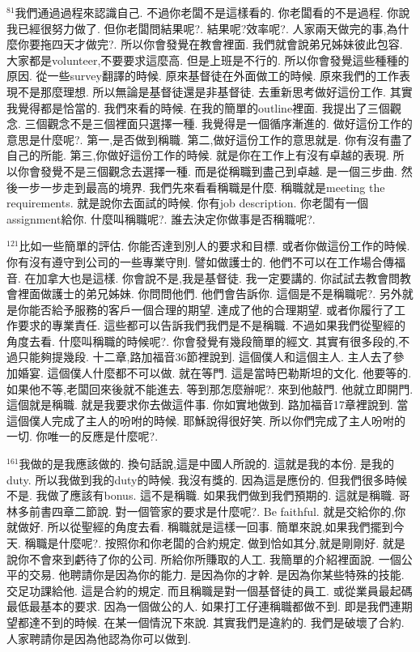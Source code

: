 \documentclass{book}
\begin{document}
$^{81}$我們通過過程來認識自己.
不過你老闆不是這樣看的.
你老闆看的不是過程.
你說我已經很努力做了.
但你老闆問結果呢?.
結果呢?效率呢?.
人家兩天做完的事,為什麼你要拖四天才做完?.
所以你會發覺在教會裡面.
我們就會說弟兄姊妹彼此包容.
大家都是volunteer,不要要求這麼高.
但是上班是不行的.
所以你會發覺這些種種的原因.
從一些survey翻譯的時候.
原來基督徒在外面做工的時候.
原來我們的工作表現不是那麼理想.
所以無論是基督徒還是非基督徒.
去重新思考做好這份工作.
其實我覺得都是恰當的.
我們來看的時候.
在我的簡單的outline裡面.
我提出了三個觀念.
三個觀念不是三個裡面只選擇一種.
我覺得是一個循序漸進的.
做好這份工作的意思是什麼呢?.
第一,是否做到稱職.
第二,做好這份工作的意思就是.
你有沒有盡了自己的所能.
第三,你做好這份工作的時候.
就是你在工作上有沒有卓越的表現.
所以你會發覺不是三個觀念去選擇一種.
而是從稱職到盡己到卓越.
是一個三步曲.
然後一步一步走到最高的境界.
我們先來看看稱職是什麼.
稱職就是meeting the requirements.
就是說你去面試的時候.
你有job description.
你老闆有一個assignment給你.
什麼叫稱職呢?.
誰去決定你做事是否稱職呢?.

$^{121}$比如一些簡單的評估.
你能否達到別人的要求和目標.
或者你做這份工作的時候.
你有沒有遵守到公司的一些專業守則.
譬如做護士的.
他們不可以在工作場合傳福音.
在加拿大也是這樣.
你會說不是,我是基督徒.
我一定要講的.
你試試去教會問教會裡面做護士的弟兄姊妹.
你問問他們.
他們會告訴你.
這個是不是稱職呢?.
另外就是你能否給予服務的客戶一個合理的期望.
達成了他的合理期望.
或者你履行了工作要求的專業責任.
這些都可以告訴我們我們是不是稱職.
不過如果我們從聖經的角度去看.
什麼叫稱職的時候呢?.
你會發覺有幾段簡單的經文.
其實有很多段的,不過只能夠提幾段.
十二章,路加福音36節裡說到.
這個僕人和這個主人.
主人去了參加婚宴.
這個僕人什麼都不可以做.
就在等門.
這是當時巴勒斯坦的文化.
他要等的.
如果他不等,老闆回來後就不能進去.
等到那怎麼辦呢?.
來到他敲門.
他就立即開門.
這個就是稱職.
就是我要求你去做這件事.
你如實地做到.
路加福音17章裡說到.
當這個僕人完成了主人的吩咐的時候.
耶穌說得很好笑.
所以你們完成了主人吩咐的一切.
你唯一的反應是什麼呢?.

$^{161}$我做的是我應該做的.
換句話說,這是中國人所說的.
這就是我的本份.
是我的duty.
所以我做到我的duty的時候.
我沒有獎的.
因為這是應份的.
但我們很多時候不是.
我做了應該有bonus.
這不是稱職.
如果我們做到我們預期的.
這就是稱職.
哥林多前書四章二節說.
對一個管家的要求是什麼呢?.
Be faithful.
就是交給你的,你就做好.
所以從聖經的角度去看.
稱職就是這樣一回事.
簡單來說,如果我們擺到今天.
稱職是什麼呢?.
按照你和你老闆的合約規定.
做到恰如其分,就是剛剛好.
就是說你不會來到虧待了你的公司.
所給你所賺取的人工.
我簡單的介紹裡面說.
一個公平的交易.
他聘請你是因為你的能力.
是因為你的才幹.
是因為你某些特殊的技能.
交足功課給他.
這是合約的規定.
而且稱職是對一個基督徒的員工.
或從業員最起碼最低最基本的要求.
因為一個做公的人.
如果打工仔連稱職都做不到.
即是我們連期望都達不到的時候.
在某一個情況下來說.
其實我們是違約的.
我們是破壞了合約.
人家聘請你是因為他認為你可以做到.
\end{document}
